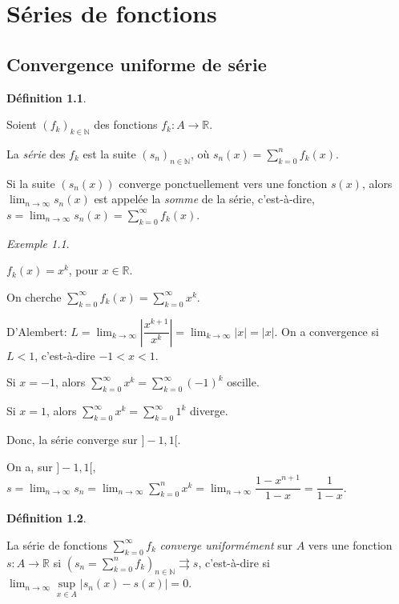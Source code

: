 \documentclass{report}
\newcommand*{\dsum}[4]{\displaystyle\sum_{#1=#2}^{#3}#4}
\newcommand*{\dlim}[3]{\displaystyle\lim_{#1 \to #2}#3}
\newcommand*{\abs}[1]{\left| #1 \right|}
\newcommand*{\convuni}{\rightrightarrows}
\newcommand*{\reels}{\mathbb{R}}
\newcommand*{\naturels}{\mathbb{N}}
\theoremstyle{definition}
\newtheorem*{defin}{D\'efinition}
\theoremstyle{remark}
\newtheorem*{exem}{Exemple}
\begin{document}
	\chapter{S\'eries de fonctions}
	\section{Convergence uniforme de s\'erie}
	\begin{defin}~

		Soient $(f_k)_{k \in \naturels}$ des fonctions $f_k:A \to \reels$.

		La \emph{s\'erie} des $f_k$ est la suite $(s_n)_{n \in \naturels}$, o\`u $s_n(x) = \dsum{k}{0}{n}{f_k(x)}$.

		Si la suite $(s_n(x))$ converge ponctuellement vers une fonction $s(x)$, alors $\dlim{n}{\infty}{s_n(x)}$ est appel\'ee la \emph{somme} de la s\'erie, c'est-\`a-dire, $s = \dlim{n}{\infty}{s_n(x)} = \dsum{k}{0}{\infty}{f_k(x)}$.
	\end{defin}
	\begin{exem}~

		$f_k(x) = x^k$, pour $x \in \reels$.

		On cherche $\dsum{k}{0}{\infty}{f_k(x)} = \dsum{k}{0}{\infty}{x^k}$.

		D'Alembert: $L = \dlim{k}{\infty}{\abs{\dfrac{x^{k+1}}{x^k}}} = \dlim{k}{\infty}{\abs{x}} = \abs{x}$. On a convergence si $L<1$, c'est-\`a-dire $-1<x<1$.

		Si $x=-1$, alors $\dsum{k}{0}{\infty}{x^k} = \dsum{k}{0}{\infty}{(-1)^k}$ oscille.

		Si $x=1$, alors $\dsum{k}{0}{\infty}{x^k} = \dsum{k}{0}{\infty}{1^k}$ diverge.

		Donc, la s\'erie converge sur $]-1,1[$.

		On a, sur $]-1,1[$, $s = \dlim{n}{\infty}{s_n} = \dlim{n}{\infty}{\dsum{k}{0}{n}{x^k}} = \dlim{n}{\infty}{\dfrac{1-x^{n+1}}{1-x}} = \dfrac{1}{1-x}$.
	\end{exem}
	\begin{defin}~

		La s\'erie de fonctions $\dsum{k}{0}{\infty}{f_k}$ \emph{converge uniform\'ement} sur $A$ vers une fonction $s:A \to \reels$ si $\left(s_n=\dsum{k}{0}{n}{f_k}\right)_{n \in \naturels} \convuni s$, c'est-\`a-dire si $\dlim{n}{\infty}{\sup\limits_{x \in A}\abs{s_n(x)-s(x)}}=0$.
	\end{defin}
\end{document}
